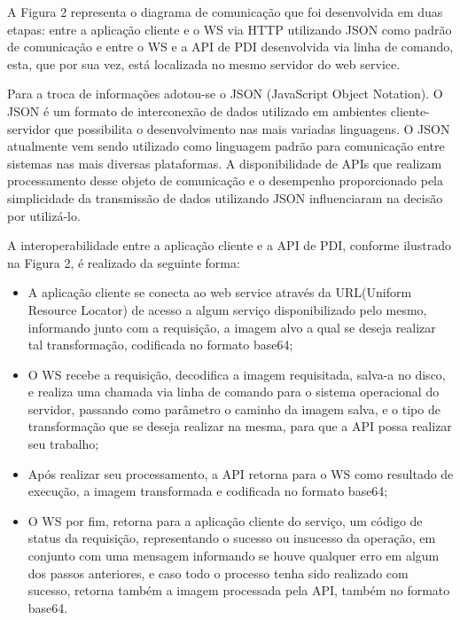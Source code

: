 \documentclass[12pt]{article}
\begin{document}

A Figura 2 representa o diagrama de comunicação que
foi desenvolvida em duas etapas: entre a aplicação cliente e o WS via HTTP utilizando JSON como padrão de comunicação e entre
o WS e a API de PDI desenvolvida via linha de comando, esta, que por sua vez, está localizada no mesmo servidor do web service.

Para a troca de informações adotou-se o JSON (JavaScript Object Notation). O
JSON é um formato de interconexão de dados utilizado em ambientes cliente-servidor
que possibilita o desenvolvimento nas mais variadas linguagens. O JSON atualmente
vem sendo utilizado como linguagem padrão para comunicação entre sistemas nas mais
diversas plataformas. A disponibilidade de APIs que realizam processamento desse objeto de comunicação e o desempenho proporcionado
pela simplicidade da transmissão de dados utilizando JSON influenciaram na decisão
por utilizá-lo.

A interoperabilidade entre a aplicação cliente e a API de PDI, conforme ilustrado na Figura 2, é
realizado da seguinte forma:
\begin{itemize}
	\item A aplicação cliente se conecta ao web service através da URL(Uniform Resource Locator) de acesso a algum serviço disponibilizado pelo mesmo, informando junto com a requisição, a imagem alvo a qual se deseja realizar tal transformação, codificada no formato base64;
	\item O WS recebe a requisição, decodifica a imagem requisitada, salva-a no disco, e realiza uma chamada via linha de comando para o sistema operacional do servidor, passando como parâmetro o caminho da imagem salva, e o tipo de transformação que se deseja realizar na mesma, para que a API possa realizar seu trabalho;
	\item Após realizar seu processamento, a API retorna para o WS como resultado de execução, a imagem transformada e codificada no formato base64;
	\item O WS por fim, retorna para a aplicação cliente do serviço, um código de status da requisição, representando o sucesso ou insucesso da operação, em conjunto com uma mensagem informando se houve qualquer erro em algum dos passos anteriores, e caso todo o processo tenha sido realizado com sucesso, retorna também a imagem processada pela API, também no formato base64.
\end{itemize}
\end{document}
